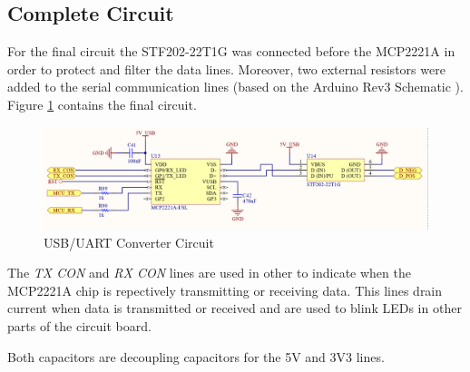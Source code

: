	\subsection{Complete Circuit}

		For the final circuit the STF202-22T1G was connected before the MCP2221A in order to protect and filter the data lines. Moreover, two external resistors were added to the serial communication lines (based on the Arduino Rev3 Schematic \cite{arduino-rev3-schematic}). Figure \ref{fig:usb-uart-circuit} contains the final circuit.

		\begin{figure}[htbp]
			\centering
				\includegraphics[scale=.8]{figuras/fig-usb-uart-circuit}
			\caption{USB/UART Converter Circuit \cite{usb-uart-circuit}}
			\label{fig:usb-uart-circuit}
		\end{figure}

		The \textit{TX CON} and \textit{RX CON} lines are used in other to indicate when the MCP2221A chip is repectively transmitting or receiving data. This lines drain current when data is transmitted or received and are used to blink LEDs in other parts of the circuit board. 

		Both capacitors are decoupling capacitors for the 5V and 3V3 lines. 